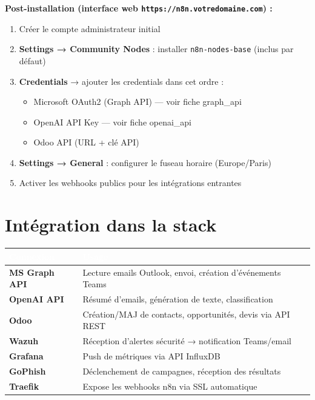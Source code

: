 \documentclass[11pt, a4paper]{article}
\begin{document}
\textbf{Post-installation (interface web \texttt{https://n8n.votredomaine.com}) :}
\begin{enumerate}
  \item Créer le compte administrateur initial
  \item \textbf{Settings → Community Nodes} : installer \texttt{n8n-nodes-base} (inclus par défaut)
  \item \textbf{Credentials} → ajouter les credentials dans cet ordre :
    \begin{itemize}
      \item Microsoft OAuth2 (Graph API) — voir fiche graph\_api
      \item OpenAI API Key — voir fiche openai\_api
      \item Odoo API (URL + clé API)
    \end{itemize}
  \item \textbf{Settings → General} : configurer le fuseau horaire (Europe/Paris)
  \item Activer les webhooks publics pour les intégrations entrantes
\end{enumerate}

\section{Intégration dans la stack}

\begin{center}
\renewcommand{\arraystretch}{1.4}
\begin{tabularx}{\linewidth}{>{\bfseries}p{2.8cm} X}
\toprule
\rowcolor{tabheader}
\textcolor{white}{\textbf{Connexion}} & \textcolor{white}{\textbf{Usage}} \\
\midrule
MS Graph API & Lecture emails Outlook, envoi, création d'événements Teams \\
\rowcolor{rowgray}
OpenAI API & Résumé d'emails, génération de texte, classification \\
Odoo & Création/MAJ de contacts, opportunités, devis via API REST \\
\rowcolor{rowgray}
Wazuh & Réception d'alertes sécurité → notification Teams/email \\
Grafana & Push de métriques via API InfluxDB \\
\rowcolor{rowgray}
GoPhish & Déclenchement de campagnes, réception des résultats \\
Traefik & Expose les webhooks n8n via SSL automatique \\
\bottomrule
\end{tabularx}
\end{center}
\end{document}
